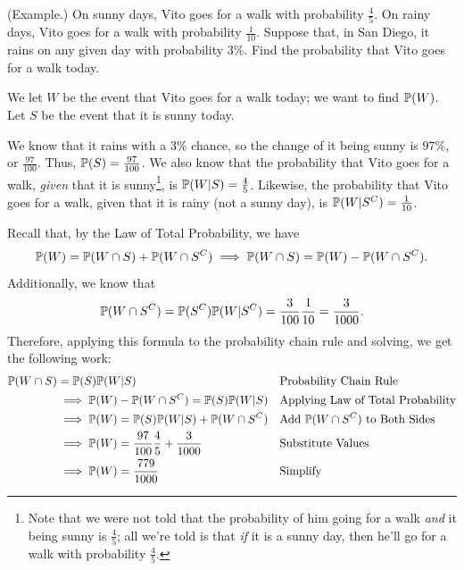 \documentclass[letterpaper]{article}
\begin{document}
\begin{mdframed}[nobreak=true]
    (Example.) On sunny days, Vito goes for a walk with probability $\frac{4}{5}$. On rainy days, Vito goes for a walk with probability $\frac{1}{10}$. Suppose that, in San Diego, it rains on any given day with probability $3\%$. Find the probability that Vito goes for a walk today. 

    \begin{mdframed}[]
        We let $W$ be the event that Vito goes for a walk today; we want to find $\mathbb{P}(W)$. Let $S$ be the event that it is sunny today.

        \bigskip 

        We know that it rains with a $3\%$ chance, so the change of it being sunny is $97\%$, or $\frac{97}{100}$. Thus, $\mathbb{P}(S) = \frac{97}{100}$. We also know that the probability that Vito goes for a walk, \emph{given} that it is sunny\footnote{Note that we were not told that the probability of him going for a walk \emph{and} it being sunny is $\frac{4}{5}$; all we're told is that \emph{if} it is a sunny day, then he'll go for a walk with probability $\frac{4}{5}$.}, is $\mathbb{P}(W | S) = \frac{4}{5}$. Likewise, the probability that Vito goes for a walk, given that it is rainy (not a sunny day), is $\mathbb{P}(W | S^C) = \frac{1}{10}$. 

        \bigskip 

        Recall that, by the Law of Total Probability, we have 
        \[\mathbb{P}(W) = \mathbb{P}(W \cap S) + \mathbb{P}(W \cap S^C) \implies \mathbb{P}(W \cap S) = \mathbb{P}(W) - \mathbb{P}(W \cap S^C).\]
        Additionally, we know that 
        \[\mathbb{P}(W \cap S^C) = \mathbb{P}(S^C) \mathbb{P}(W | S^C) = \frac{3}{100} \frac{1}{10} = \frac{3}{1000}.\]
        Therefore, applying this formula to the probability chain rule and solving, we get the following work: 
        \begin{equation*}
            \begin{aligned}
                \mathbb{P}(W \cap S) &= \mathbb{P}(S) \mathbb{P}(W | S) && \text{Probability Chain Rule}\\ 
                    &\implies \mathbb{P}(W) - \mathbb{P}(W \cap S^C) = \mathbb{P}(S) \mathbb{P}(W | S) && \text{Applying Law of Total Probability} \\ 
                    &\implies \mathbb{P}(W) = \mathbb{P}(S) \mathbb{P}(W | S) + \mathbb{P}(W \cap S^C) && \text{Add } \mathbb{P}(W \cap S^C) \text{ to Both Sides}\\ 
                    &\implies \mathbb{P}(W) = \frac{97}{100} \frac{4}{5} + \frac{3}{1000} && \text{Substitute Values} \\ 
                    &\implies \mathbb{P}(W) = \frac{779}{1000} && \text{Simplify}
            \end{aligned}
        \end{equation*}
    \end{mdframed}
\end{mdframed}
\end{document}
